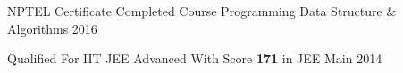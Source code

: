 \begin{cvhonors}

\cvhonor
{NPTEL Certificate} %
{Completed Course Programming Data Structure \& Algorithms \vspace{5pt}} %
{} %
{\vspace{5pt}2016} %

\cvhonor
{Qualified} %
{For IIT JEE Advanced With Score \textbf{171} in JEE Main} %
{} %
{2014} %


\end{cvhonors}
